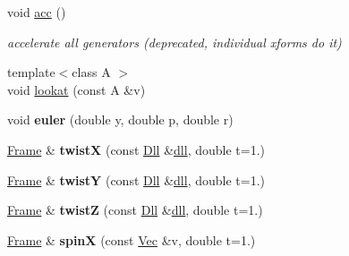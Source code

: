 \begin{DoxyCompactItemize}
\item 
\hypertarget{classvsr_1_1_frame_a0d018fcb04be9a1452c7f830e1244254}{void \hyperlink{classvsr_1_1_frame_a0d018fcb04be9a1452c7f830e1244254}{acc} ()}\label{classvsr_1_1_frame_a0d018fcb04be9a1452c7f830e1244254}

\begin{DoxyCompactList}\small\item\em accelerate all generators (deprecated, individual xforms do it) \end{DoxyCompactList}\item 
{\footnotesize template$<$class A $>$ }\\void \hyperlink{classvsr_1_1_frame_a09c511db1354428afc5711f304b3dc94}{lookat} (const A \&v)
\item 
\hypertarget{classvsr_1_1_frame_a15e45383dc11354f9f079cdaa8fc8ff0}{void {\bfseries euler} (double y, double p, double r)}\label{classvsr_1_1_frame_a15e45383dc11354f9f079cdaa8fc8ff0}

\item 
\hypertarget{classvsr_1_1_frame_a960a26a689b0b3a953939dc1466f8d93}{\hyperlink{classvsr_1_1_frame}{Frame} \& {\bfseries twist\-X} (const \hyperlink{namespacevsr_a6c6892b7aec25cfb16492501e2e35b11}{Dll} \&\hyperlink{classvsr_1_1_frame_acfd841636abdd2ac35ef19c1fd611939}{dll}, double t=1.)}\label{classvsr_1_1_frame_a960a26a689b0b3a953939dc1466f8d93}

\item 
\hypertarget{classvsr_1_1_frame_a55c8456aee330c1d635b4a0ea9529f4a}{\hyperlink{classvsr_1_1_frame}{Frame} \& {\bfseries twist\-Y} (const \hyperlink{namespacevsr_a6c6892b7aec25cfb16492501e2e35b11}{Dll} \&\hyperlink{classvsr_1_1_frame_acfd841636abdd2ac35ef19c1fd611939}{dll}, double t=1.)}\label{classvsr_1_1_frame_a55c8456aee330c1d635b4a0ea9529f4a}

\item 
\hypertarget{classvsr_1_1_frame_adb56371a48f60faa3859c282c3cf69b0}{\hyperlink{classvsr_1_1_frame}{Frame} \& {\bfseries twist\-Z} (const \hyperlink{namespacevsr_a6c6892b7aec25cfb16492501e2e35b11}{Dll} \&\hyperlink{classvsr_1_1_frame_acfd841636abdd2ac35ef19c1fd611939}{dll}, double t=1.)}\label{classvsr_1_1_frame_adb56371a48f60faa3859c282c3cf69b0}

\item 
\hypertarget{classvsr_1_1_frame_a862cc83cc8ab6db89b180e4257631f92}{\hyperlink{classvsr_1_1_frame}{Frame} \& {\bfseries spin\-X} (const \hyperlink{namespacevsr_a0d061c30ac198a710a1b92dd8b343273}{Vec} \&v, double t=1.)}\label{classvsr_1_1_frame_a862cc83cc8ab6db89b180e4257631f92}


\end{DoxyCompactItemize}
